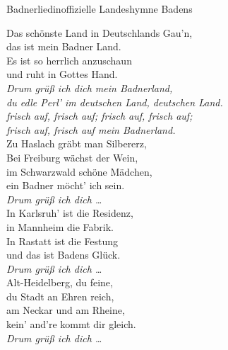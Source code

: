 
\begin{lied}{Badnerlied}{inoffizielle Landeshymne Badens}

Das schönste Land in Deutschlands Gau’n,\\
das ist mein Badner Land.\\
Es ist so herrlich anzuschaun\\
und ruht in Gottes Hand.\\

\textit{Drum grüß ich dich mein Badnerland,\\
du edle Perl’ im deutschen Land, deutschen Land.\\
frisch auf, frisch auf; frisch auf, frisch auf;\\
frisch auf, frisch auf mein Badnerland.}\\

Zu Haslach gräbt man Silbererz,\\
Bei Freiburg wächst der Wein,\\
im Schwarzwald schöne Mädchen,\\
ein Badner möcht’ ich sein.\\

\textit{Drum grüß ich dich …}\\

In Karlsruh’ ist die Residenz,\\
in Mannheim die Fabrik.\\
In Rastatt ist die Festung\\
und das ist Badens Glück.\\

\textit{Drum grüß ich dich …}\\

Alt-Heidelberg, du feine,\\
du Stadt an Ehren reich,\\
am Neckar und am Rheine,\\
kein’ and’re kommt dir gleich.\\

\textit{Drum grüß ich dich …}\\
\end{lied}
